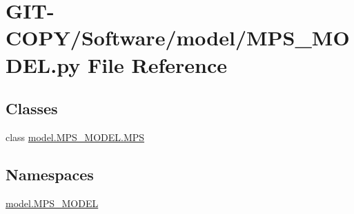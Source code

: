 \hypertarget{GIT-COPY_2Software_2model_2MPS__MODEL_8py}{}\section{G\+I\+T-\/\+C\+O\+P\+Y/\+Software/model/\+M\+P\+S\+\_\+\+M\+O\+D\+E\+L.py File Reference}
\label{GIT-COPY_2Software_2model_2MPS__MODEL_8py}
\subsection*{Classes}
\begin{DoxyCompactItemize}
\item 
class \hyperlink{classmodel_1_1MPS__MODEL_1_1MPS}{model.\+M\+P\+S\+\_\+\+M\+O\+D\+E\+L.\+M\+P\+S}
\end{DoxyCompactItemize}
\subsection*{Namespaces}
\begin{DoxyCompactItemize}
\item 
 \hyperlink{namespacemodel_1_1MPS__MODEL}{model.\+M\+P\+S\+\_\+\+M\+O\+D\+E\+L}
\end{DoxyCompactItemize}
